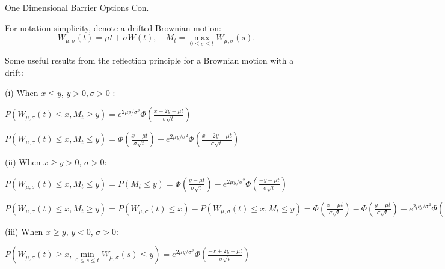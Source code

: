 \documentclass{beamer}
\begin{document}
\begin{frame}{One Dimensional Barrier Options Con.}
    
    {\footnotesize \footnotesize
    \par For notation simplicity, denote a drifted Brownian motion:
          \[
          W_{\mu,\sigma}(t) = \mu t + \sigma W(t), \quad M_t = \max_{0 \leq s \leq t} W_{\mu,\sigma}(s).
          \]
    \par \pause Some useful results from the reflection principle for a Brownian motion with a  drift:
    \par (i) When \( x \leq y \), $y > 0,  \sigma > 0$ :
    \begin{itemize}
         {\footnotesize \scriptsize
        \item $P(W_{\mu, \sigma}(t) \leq x,  M_t \geq y) = e^{2\mu y / \sigma^2} 
        \Phi \left( \frac{x - 2y - \mu t}{\sigma \sqrt{t}} \right)$
        \item $P(W_{\mu, \sigma}(t) \leq x,  M_t \leq y) = \Phi \left( \frac{x - \mu t}{\sigma \sqrt{t}} \right) - e^{2\mu y / \sigma^2} 
         \Phi \left( \frac{x - 2y - \mu t}{\sigma \sqrt{t}} \right)$
         }
    \end{itemize}\pause
    \par (ii) When \( x \geq y>0 \), $\sigma > 0$:
    \begin{itemize}
         {\footnotesize \scriptsize
        \item $P(W_{\mu, \sigma}(t) \leq x,  M_t \leq y) = P(M_t \leq y) \nonumber =
            \Phi \left( \frac{y - \mu t}{\sigma \sqrt{t}} \right) - e^{2\mu y / \sigma^2} \Phi 
            \left( \frac{-y - \mu t}{\sigma \sqrt{t}} \right)$
        \item $P(W_{\mu, \sigma}(t) \leq x,  M_t \geq y) = P(W_{\mu, \sigma}(t) \leq x) - P(W_{\mu, \sigma}(t) \leq x,  M_t \leq y) \nonumber 
            = \Phi \left( \frac{x - \mu t}{\sigma \sqrt{t}} \right) - 
            \Phi \left( \frac{y - \mu t}{\sigma \sqrt{t}} \right) + e^{2\mu y / \sigma^2} \Phi \left( \frac{-y - \mu t}{\sigma \sqrt{t}} \right)$
         }
    \end{itemize}\pause
    \par (iii) When \( x \geq y \), $y < 0$, $\sigma > 0$:
    \begin{itemize}{\footnotesize \scriptsize
        \item $P\left( W_{\mu, \sigma}(t) \geq x, \min\limits_{0 \leq s \leq t} W_{\mu, \sigma}(s) \leq y \right) 
        = e^{2\mu y / \sigma^2} \Phi \left( \frac{-x + 2y + \mu t}{\sigma \sqrt{t}} \right)$
        }
    \end{itemize}
    }
\end{frame}
\end{document}
